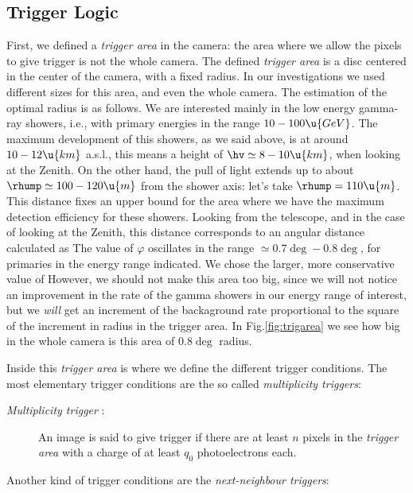 \subsection{Trigger Logic}
\label{sec:triggerlogic}
%
First, we defined a \emph{trigger area} in the camera: the area where
we allow the pixels to give trigger is not the whole camera. The
defined \emph{trigger area} is a disc centered in the center of the
camera, with a fixed radius. In our investigations we used different
sizes for this area, and even the whole camera. The estimation of the
optimal radius is as follows. We are interested mainly in the low
energy gamma-ray showers, i.e., with primary energies in the range
$10-100\u{GeV}$. The maximum development of this showers, as we said
above, is at around $10-12\u{km}$ a.s.l., this means a height of
$\hv\simeq 8-10\u{km}$, when looking at the Zenith. On the other hand,
the \Cherenkov pull of light extends up to about $\rhump\simeq
100-120\u{m}$ from the shower axis: let's take $\rhump=110\u{m}$.
This distance fixes an upper bound for the area where we have the
maximum detection efficiency for these showers. Looking from the
telescope, and in the case of looking at the Zenith, this distance
corresponds to an angular distance calculated as
%
\trigradeq
%
The value of $\varphi$ oscillates in the range $\simeq
0.7\deg-0.8\deg$, for primaries in the energy range indicated. We
chose the larger, more conservative value of 
%
\phitriggereq
%
However, we should not make this area too big, since we will not
notice an improvement in the rate of the gamma showers in our energy
range of interest, but we \emph{will} get an increment of the
backaground rate proportional to the square of the increment in radius
in the trigger area. In Fig.\ref{fig:trigarea} we see how big in the
whole camera is this area of $0.8\deg$ radius.

\trigareafig

Inside this \emph{trigger area} is where we define the different
trigger conditions. The most elementary trigger conditions are the so
called \emph{multiplicity triggers}:

\begin{description}
\item[\emph{Multiplicity trigger} :] An image is said
  to give trigger if there are at least $n$ pixels in the
  \emph{trigger area} with a charge of at least $q_0$ photoelectrons
  each.
\end{description}

\noindent
Another kind of trigger conditions are the \emph{next-neighbour
  triggers}:


